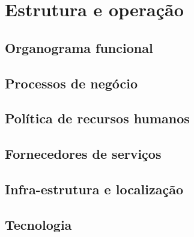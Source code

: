 \chapter{Estrutura e operação} 

\cite{slack2009operations}

\cite{slack2002administração}

\cite{nigel2009operations}

\section{Organograma funcional}

\section{Processos de negócio}

\section{Política de recursos humanos}

\section{Fornecedores de serviços}

\section{Infra-estrutura e localização}

\section{Tecnologia}

